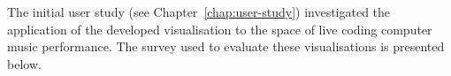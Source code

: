 The initial user study (see Chapter~\ref{chap:user-study}) investigated the application of the developed visualisation to the space of live coding computer music performance. The survey used to evaluate these visualisations is presented below.

\clearpage

\begin{center}
\end{center}

